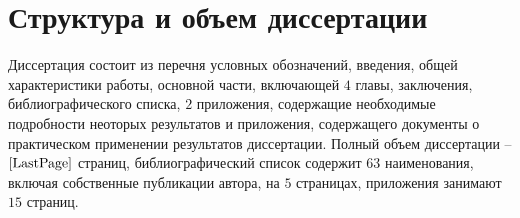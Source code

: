 \documentclass[_00_dissertation.tex]{subfiles}
\begin{document}
\section*{Структура и объем диссертации}

Диссертация состоит из перечня условных обозначений, введения, общей характеристики работы, основной части, включающей $4$ главы, заключения, библиографического списка, $2$ приложения, содержащие необходимые подробности неоторых результатов и приложения, содержащего документы о практическом применении результатов диссертации.
Полный объем диссертации -- $\pageref{LastPage}$ страниц, библиографический список содержит $63$ наименования, включая собственные публикации автора, на $5$ страницах, приложения занимают $15$ страниц.
















\onlyinsubfile{
    
    
}
\end{document}

